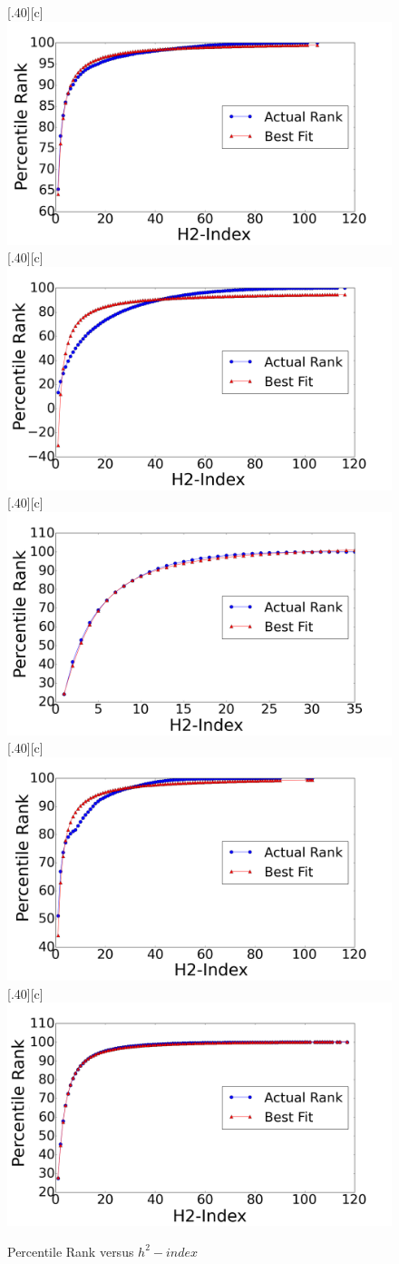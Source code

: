 \documentclass[12pt,3p]{article}
\begin{document}
\begin{figure}[htp]
  [.40\linewidth][c]{%
    \includegraphics[width=.40\linewidth]{images/enron_k.png}}
    [.40\linewidth][c]{%
    \includegraphics[width=.40\linewidth]{images/fb_k.png}}\quad
  [.40\linewidth][c]{%
    \includegraphics[width=.40\linewidth]{images/fbwall_k.png}}
    [.40\linewidth][c]{%
    \includegraphics[width=.40\linewidth]{images/foursquare_k.png}}\quad
  [.40\linewidth][c]{%
    \includegraphics[width=.40\linewidth]{images/gowalla_k.png}}
  \caption{Percentile Rank versus $h^2-index$}
  \label{fig1}
\end{figure}
\end{document}
